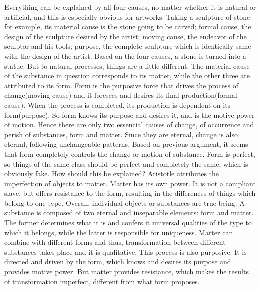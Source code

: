 \documentclass[11pt]{article}
\begin{document}
  Everything can be explained by all four causes, no matter whether it is natural or artificial, and this is especially obvious for artworks. Taking a sculpture of stone for example, its material cause is the stone going to be carved; formal cause, the design of the sculpture desired by the artist; moving cause, the endeavor of the sculptor and his tools; purpose, the complete sculpture which is identically same with the design of the artist. Based on the four causes, a stone is turned into a statue. But to natural processes, things are a little different. The material cause of the substance in question corresponds to its matter, while the other three are attributed to its form. Form is the purposive force that drives the process of change(moving cause) and it foresees and desires its final production(formal cause). When the process is completed, its production is dependent on its form(purpose). So form knows its purpose and desires it, and is the motive power of motion. Hence there are only two essencial causes of change, of occurrence and perish of substances, form and matter. Since they are eternal, change is also eternal, following unchangeable patterns.
  Based on previous argument, it seems that form completely controls the change or motion of substance. Form is perfect, so things of the same class should be perfect and completely the same, which is obviously fake. How should this be explained? Aristotle attributes the imperfection of objects to matter. Matter has its own power. It is not a compliant slave, but offers resistance to the form, resulting in the differences of things which belong to one type.
  Overall, individual objects or substances are true being. A substance is composed of two eternal and inseparable elements: form and matter. The former determines what it is and confers it universal qualities of the type to which it belongs, while the latter is responsible for uniqueness. Matter can combine with different forms and thus, transformation between different substances takes place and it is qualitative. This process is also purposive. It is directed and driven by the form, which knows and desires its purpose and provides motive power. But matter provides resistance, which makes the results of transformation imperfect, different from what form proposes. 
\end{document}

